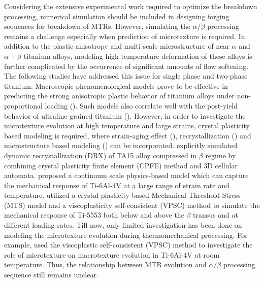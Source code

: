 \documentclass[review]{elsarticle}
\begin{document}
Considering the extensive experimental work required to optimize the breakdown processing, numerical simulation should be included in designing forging sequences for breakdown of MTRs.
However, simulating the $\alpha /\beta$ processing remains a challenge especially when prediction of microtexture is required.
In addition to the plastic anisotropy and multi-scale microstructure of near $\alpha$ and $\alpha + \beta$ titanium alloys, modeling high temperature deformation of these alloys is further complicated by the occurrence of significant amounts of flow softening.
The following studies have addressed this issue for single phase and two-phase titanium.
Macroscopic phenomenological models prove to be effective in predicting the strong anisotropic plastic behavior of titanium alloys under non-proportional loading (\cite{Khan-multiaxial,Khan-ti6al4v}).
Such models also correlate well with the post-yield behavior of ultrafine-grained titanium (\cite{Khan-nanocrystalline}).
However, in order to investigate the microtexture evolution at high temperature and large strains, crystal plasticity based modeling is required, where strain-aging effect (\cite{McDowell-TiCPFE}), recrystallization (\cite{Yang-VPSC}) and microstructure based modeling (\cite{Ghosh-TiCPFE}) can be incorporated.
\cite{r15} explicitly simulated dynamic recrystallization (DRX) of TA15 alloy compressed in $\beta$ regime by combining crystal plasticity finite element (CPFE) method and 3D cellular automata.
\cite{r16} proposed a continuum scale physics-based model which can capture the mechanical response of Ti-6Al-4V at a large range of strain rate and temperature.
\cite{r17} utilized a crystal plasticity based Mechanical Threshold Stress (MTS) model and a viscoplasticity self-consistent (VPSC) method to simulate the mechanical response of Ti-5553 both below and above the $\beta$ transus and at different loading rates.
Till now, only limited investigation has been done on modeling the microtexture evolution during thermomechanical processing.
For example, \cite{Miller2016} used the viscoplastic self-consistent (VPSC) method to investigate the role of microtexture on macrotexture evolution in Ti-6Al-4V at room temperature.
Thus, the relationship between MTR evolution and $\alpha/\beta$ processing sequence still remains unclear.
\end{document}
